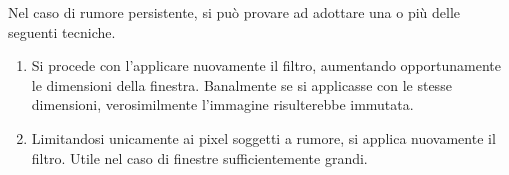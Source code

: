 \documentclass{subfiles}
\begin{document}
Nel caso di rumore persistente, si può provare ad adottare una o più delle seguenti tecniche.
\begin{enumerate}
    \item Si procede con l'applicare nuovamente il filtro, aumentando opportunamente le dimensioni della finestra.
          Banalmente se si applicasse con le stesse dimensioni, verosimilmente l'immagine risulterebbe immutata.

    \item Limitandosi unicamente ai pixel soggetti a rumore, si applica nuovamente il filtro.
          Utile nel caso di finestre sufficientemente grandi.
\end{enumerate}



\end{document}
